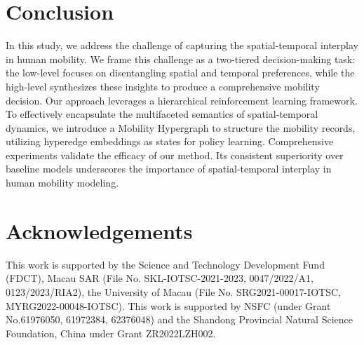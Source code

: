 \documentclass[letterpaper]{article} %
\begin{document}
\section{Conclusion}
In this study, we address the challenge of capturing the spatial-temporal interplay in human mobility. 
We frame this challenge as a two-tiered decision-making task: the low-level focuses on disentangling spatial and temporal preferences, while the high-level synthesizes these insights to produce a comprehensive mobility decision. 
Our approach leverages a hierarchical reinforcement learning framework. 
To effectively encapsulate the multifaceted semantics of spatial-temporal dynamics, we introduce a Mobility Hypergraph to structure the mobility records, utilizing hyperedge embeddings as states for policy learning. 
Comprehensive experiments validate the efficacy of our method. 
Its consistent superiority over baseline models underscores the importance of spatial-temporal interplay in human mobility modeling.

\section{Acknowledgements}
This work is supported by the Science and Technology Development Fund (FDCT), Macau SAR (File No. SKL-IOTSC-2021-2023, 0047/2022/A1, 0123/2023/RIA2), the University of Macau (File No. SRG2021-00017-IOTSC, MYRG2022-00048-IOTSC).
This work is supported by NSFC (under Grant No.61976050, 61972384, 62376048) and the Shandong Provincial Natural Science Foundation, China under Grant ZR2022LZH002.


\end{document}
